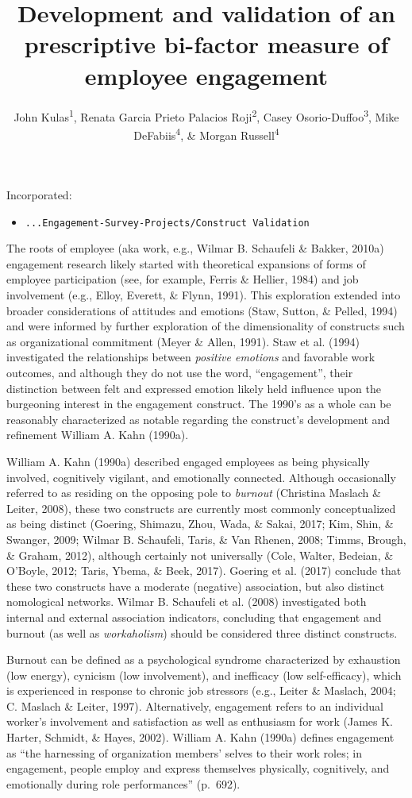 \documentclass[
  man]{apa7}
\title{Development and validation of an prescriptive bi-factor measure of employee engagement}
\author{John Kulas\textsuperscript{1}, Renata Garcia Prieto Palacios Roji\textsuperscript{2}, Casey Osorio-Duffoo\textsuperscript{3}, Mike DeFabiis\textsuperscript{4}, \& Morgan Russell\textsuperscript{4}}
\date{}
\affiliation{\vspace{0.5cm}\textsuperscript{1} eRg\\\textsuperscript{2} PepsiCo\\\textsuperscript{3} Harver\\\textsuperscript{4} Montclair State University}
\providecommand{\tightlist}{%
  \setlength{\itemsep}{0pt}\setlength{\parskip}{0pt}}
\begin{document}
\maketitle

Incorporated:

\begin{itemize}
\tightlist
\item
  \texttt{...Engagement-Survey-Projects/Construct\ Validation}
\end{itemize}

The roots of employee (aka work, e.g., Wilmar B. Schaufeli \& Bakker, 2010a) engagement research likely started with theoretical expansions of forms of employee participation (see, for example, Ferris \& Hellier, 1984) and job involvement (e.g., Elloy, Everett, \& Flynn, 1991). This exploration extended into broader considerations of attitudes and emotions (Staw, Sutton, \& Pelled, 1994) and were informed by further exploration of the dimensionality of constructs such as organizational commitment (Meyer \& Allen, 1991). Staw et al. (1994) investigated the relationships between \emph{positive emotions} and favorable work outcomes, and although they do not use the word, ``engagement'', their distinction between felt and expressed emotion likely held influence upon the burgeoning interest in the engagement construct. The 1990's as a whole can be reasonably characterized as notable regarding the construct's development and refinement William A. Kahn (1990a).

William A. Kahn (1990a) described engaged employees as being physically involved, cognitively vigilant, and emotionally connected. Although occasionally referred to as residing on the opposing pole to \emph{burnout} (Christina Maslach \& Leiter, 2008), these two constructs are currently most commonly conceptualized as being distinct (Goering, Shimazu, Zhou, Wada, \& Sakai, 2017; Kim, Shin, \& Swanger, 2009; Wilmar B. Schaufeli, Taris, \& Van Rhenen, 2008; Timms, Brough, \& Graham, 2012), although certainly not universally (Cole, Walter, Bedeian, \& O'Boyle, 2012; Taris, Ybema, \& Beek, 2017). Goering et al. (2017) conclude that these two constructs have a moderate (negative) association, but also distinct nomological networks. Wilmar B. Schaufeli et al. (2008) investigated both internal and external association indicators, concluding that engagement and burnout (as well as \emph{workaholism}) should be considered three distinct constructs.

Burnout can be defined as a psychological syndrome characterized by exhaustion (low energy), cynicism (low involvement), and inefficacy (low self-efficacy), which is experienced in response to chronic job stressors (e.g., Leiter \& Maslach, 2004; C. Maslach \& Leiter, 1997). Alternatively, engagement refers to an individual worker's involvement and satisfaction as well as enthusiasm for work (James K. Harter, Schmidt, \& Hayes, 2002). William A. Kahn (1990a) defines engagement as ``the harnessing of organization members' selves to their work roles; in engagement, people employ and express themselves physically, cognitively, and emotionally during role performances'' (p.~692).
\end{document}
